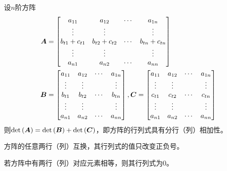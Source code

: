 \documentclass{ctexart}
\begin{document}
\begin{property}
    设\(n\)阶方阵
    \begin{align*}
        \boldsymbol{A} & =\begin{bmatrix}
            a_{11}        & a_{12}        & \cdots & a_{1n}        \\
            \vdots        & \vdots        &        & \vdots        \\
            b_{t1}+c_{t1} & b_{t2}+c_{t2} & \cdots & b_{tn}+c_{tn} \\
            \vdots        & \vdots        &        & \vdots        \\
            a_{n1}        & a_{n2}        & \cdots & a_{nn}
        \end{bmatrix}                                  \\
        \boldsymbol{B} & =\begin{bmatrix}
            a_{11} & a_{12} & \cdots & a_{1n} \\
            \vdots & \vdots &        & \vdots \\
            b_{t1} & b_{t2} & \cdots & b_{tn} \\
            \vdots & \vdots &        & \vdots \\
            a_{n1} & a_{n2} & \cdots & a_{nn}
        \end{bmatrix},\boldsymbol{C}=\begin{bmatrix}
            a_{11} & a_{12} & \cdots & a_{1n} \\
            \vdots & \vdots &        & \vdots \\
            c_{t1} & c_{t2} & \cdots & c_{tn} \\
            \vdots & \vdots &        & \vdots \\
            a_{n1} & a_{n2} & \cdots & a_{nn}
        \end{bmatrix}
    \end{align*}
    则\(\mathrm{det}\left( \boldsymbol{A} \right)=\mathrm{det}\left( \boldsymbol{B} \right)+\mathrm{det}\left( \boldsymbol{C} \right)\)，即方阵的行列式具有分行（列）相加性。
\end{property}

\begin{property}
    方阵的任意两行（列）互换，其行列式的值只改变正负号。
\end{property}

\begin{infer}
    若方阵中有两行（列）对应元素相等，则其行列式为\(0\)。
\end{infer}
\end{document}
